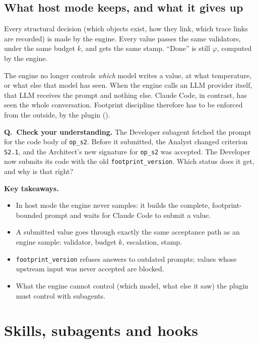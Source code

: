 \documentclass[10pt,a4paper]{article}
\newcommand{\cc}{Claude Code}
\newcommand{\code}[1]{\texttt{#1}}
\newcommand{\what}[1]{\par\smallskip\noindent{\sffamily\bfseries\color{accent}#1}\quad}
\newcounter{think}
\newenvironment{think}[1][Check your understanding]{%
  \refstepcounter{think}%
  \begin{tcolorbox}[enhanced, breakable, colback=thinkbg, colframe=thinkbg, arc=0pt, boxrule=0pt,
     borderline west={2.2pt}{0pt}{thinkbar}, left=8pt, right=8pt, top=5pt, bottom=5pt,
     before skip=8pt, after skip=8pt]
  \textsf{\bfseries\color{thinkbar}Q\thethink.\ #1.}\enspace}{\end{tcolorbox}}
\newenvironment{takeaway}{%
  \begin{tcolorbox}[enhanced, breakable, colback=keybg, colframe=keybg, arc=0pt, boxrule=0pt,
     borderline west={2.2pt}{0pt}{keybar}, left=8pt, right=8pt, top=5pt, bottom=5pt,
     before skip=8pt, after skip=8pt]
  \textsf{\bfseries\color{keybar}Key takeaways.}\par\smallskip}{\end{tcolorbox}}
\begin{document}
\subsection{What host mode keeps, and what it gives up}

\what{Kept.} Every structural decision (which objects exist, how they link,
which trace links are recorded) is made by the engine. Every value passes
the same validators, under the same budget $k$, and gets the same stamp.
``Done'' is still $\varphi$, computed by the engine.

\what{Given up.} The engine no longer controls \emph{which} model writes a
value, at what temperature, or what else that model has seen. When the
engine calls an LLM provider itself, that LLM receives the prompt and
nothing else. \cc{}, in contrast, has seen the whole conversation.
Footprint discipline therefore has to be enforced from the outside, by the
plugin ().

\begin{think}
The Developer subagent fetched the prompt for the code body of
\code{op\_s2}. Before it submitted, the Analyst changed criterion
\code{S2.1}, and the Architect's new signature for \code{op\_s2} was
accepted. The Developer now submits its code with the old
\code{footprint\_version}. Which status does it get, and why is that right?
\end{think}

\begin{takeaway}
\begin{itemize}
\item In host mode the engine never samples: it builds the complete,
footprint-bounded prompt and waits for \cc{} to submit a value.
\item A submitted value goes through exactly the same acceptance path as an
engine sample: validator, budget $k$, escalation, stamp.
\item \code{footprint\_version} refuses answers to outdated prompts;
values whose upstream input was never accepted are blocked.
\item What the engine cannot control (which model, what else it saw) the
plugin must control with subagents.
\end{itemize}
\end{takeaway}

\section{Skills, subagents and hooks}\label{sec:parts}
\end{document}
